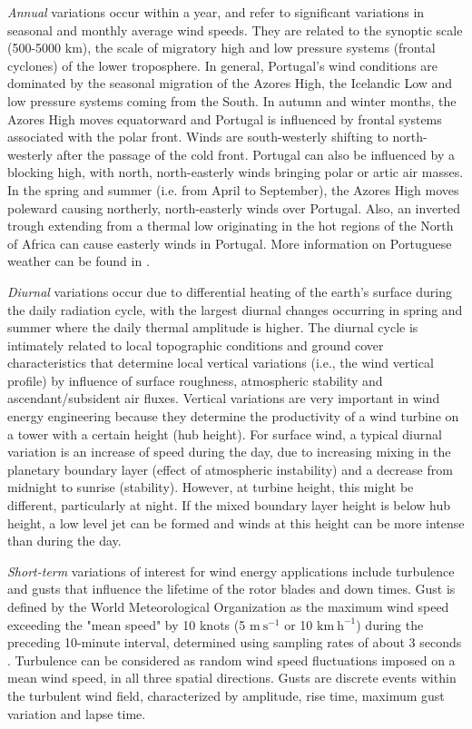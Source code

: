 \textit{Annual} variations occur within a year, and refer to significant variations in seasonal and monthly average wind speeds. They are related to the synoptic scale (500-5000 km), the scale of migratory high and low pressure systems (frontal cyclones) of the lower troposphere. In general, Portugal's wind conditions are dominated by the seasonal migration of the Azores High, the Icelandic Low \citep{Fiuza1980} and low pressure systems coming from the South. In autumn and winter months, the Azores High moves equatorward and Portugal is influenced by frontal systems associated with the polar front. Winds are south-westerly shifting to north-westerly after the passage of the cold front. Portugal can also be influenced by a blocking high, with north, north-easterly winds bringing polar or artic air masses. In the spring and summer (i.e. from April to September), the Azores High moves poleward causing northerly, north-easterly winds over Portugal. Also, an inverted trough extending from a thermal low originating in the hot regions of the North of Africa can cause easterly winds in Portugal. More information on Portuguese weather can be found in \cite{Azevedo2006}.

\textit{Diurnal} variations occur due to differential heating of the earth's surface during the daily radiation cycle, with the largest diurnal changes occurring in spring and summer where the daily thermal amplitude is higher. The diurnal cycle is intimately related to local topographic conditions and ground cover characteristics that determine local vertical variations (i.e., the wind vertical profile) by influence of surface roughness, atmospheric stability and ascendant/subsident air fluxes. Vertical variations are very important in wind energy engineering because they determine the productivity of a wind turbine on a tower with a certain height (hub height). For surface wind, a typical diurnal variation is an increase of speed  during the day, due to increasing mixing in the planetary boundary layer (effect of atmospheric instability) and a decrease from midnight to sunrise (stability). However, at turbine height, this might be different, particularly at night.  If the mixed boundary layer height is below hub height, a low level jet can be formed and winds at this height can be more intense than during the day.

\textit{Short-term} variations of interest for wind energy applications include turbulence and gusts that influence the lifetime of the rotor blades and down times. Gust is defined by the World Meteorological Organization as the maximum wind speed exceeding the "mean speed" by 10 knots (5 $\mathrm{m\ s^{-1}}$ or 10 $\mathrm{km\ h^{-1}}$)  during the preceding 10-minute interval, determined using sampling rates of about 3 seconds \citep{WMO306}. Turbulence can be considered as random wind speed fluctuations imposed on a mean wind speed, in all three spatial directions. Gusts are discrete events within the turbulent wind field, characterized by amplitude, rise time, maximum gust variation and lapse time. 

